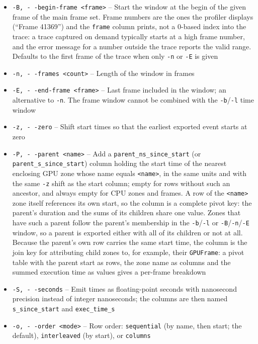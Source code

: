 \documentclass[hidelinks,titlepage,a4paper,twoside]{article}
\begin{document}
\begin{itemize}
  \item \texttt{-B, -\hspace{-1.25ex} -begin-frame <frame>} -- Start the window at the begin of the given frame of the main frame set. Frame numbers are the ones the profiler displays (\enquote{Frame 41369}) and the \texttt{frame} column prints, not a 0-based index into the trace: a trace captured on demand typically starts at a high frame number, and the error message for a number outside the trace reports the valid range. Defaults to the first frame of the trace when only \texttt{-n} or \texttt{-E} is given
  \item \texttt{-n, -\hspace{-1.25ex} -frames <count>} -- Length of the window in frames
  \item \texttt{-E, -\hspace{-1.25ex} -end-frame <frame>} -- Last frame included in the window; an alternative to \texttt{-n}. The frame window cannot be combined with the \texttt{-b}/\texttt{-l} time window
  \item \texttt{-z, -\hspace{-1.25ex} -zero} -- Shift start times so that the earliest exported event starts at zero
  \item \texttt{-P, -\hspace{-1.25ex} -parent <name>} -- Add a \texttt{parent\_ns\_since\_start} (or \texttt{parent\_s\_since\_start}) column holding the start time of the nearest enclosing GPU zone whose name equals \texttt{<name>}, in the same units and with the same \texttt{-z} shift as the start column; empty for rows without such an ancestor, and always empty for CPU zones and frames. A row of the \texttt{<name>} zone itself references its own start, so the column is a complete pivot key: the parent's duration and the sums of its children share one value. Zones that have such a parent follow the parent's membership in the \texttt{-b}/\texttt{-l} or \texttt{-B}/\texttt{-n}/\texttt{-E} window, so a parent is exported either with all of its children or not at all. Because the parent's own row carries the same start time, the column is the join key for attributing child zones to, for example, their \texttt{GPUFrame}: a pivot table with the parent start as rows, the zone name as columns and the summed execution time as values gives a per-frame breakdown
  \item \texttt{-S, -\hspace{-1.25ex} -seconds} -- Emit times as floating-point seconds with nanosecond precision instead of integer nanoseconds; the columns are then named \texttt{s\_since\_start} and \texttt{exec\_time\_s}
  \item \texttt{-o, -\hspace{-1.25ex} -order <mode>} -- Row order: \texttt{sequential} (by name, then start; the default), \texttt{interleaved} (by start), or \texttt{columns}
\end{itemize}
\end{document}
